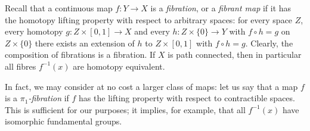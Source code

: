 \documentclass{amsart}
\begin{document}
Recall that a continuous map $f\colon Y\to X$ is a \emph{fibration}, or a
\emph{fibrant map} if it has the homotopy lifting property with respect to
arbitrary spaces: for every space $Z$, every homotopy $g\colon
Z\times[0,1]\to X$ and every $h\colon Z\times\{0\}\to Y$ with $f\circ h=g$
on $Z\times\{0\}$ there exists an extension of $h$ to $Z\times[0,1]$ with
$f\circ h=g$.  Clearly, the composition of fibrations is a fibration. If
$X$ is path connected, then in particular all fibres $f^{-1}(x)$ are
homotopy equivalent.

\begin{rem}
  In fact, we may consider at no cost a larger class of maps: let us say
  that a map $f$ is a \emph{$\pi_1$-fibration} if $f$ has the lifting
  property with respect to contractible spaces. This is sufficient for our
  purposes; it implies, for example, that all $f^{-1}(x)$ have isomorphic
  fundamental groups.
\end{rem}
\end{document}

